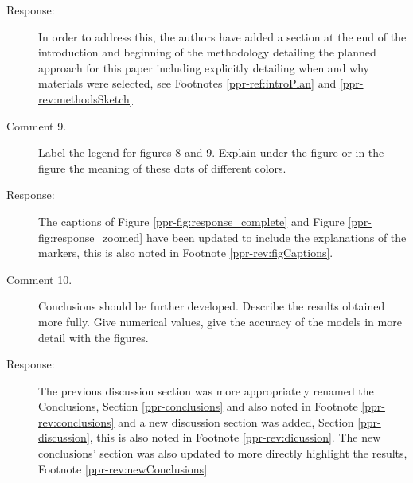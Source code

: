 \documentclass{article}
\begin{document}
\begin{description}
	\item[Response:] In order to address this, the authors have added a section at the end of the introduction and beginning of the methodology detailing the planned approach for this paper including explicitly detailing when and why materials were selected, see Footnotes \ref{ppr-ref:introPlan} and \ref{ppr-rev:methodsSketch}
	\item[Comment 9.] Label the legend for figures 8 and 9. Explain under the figure or in the figure the meaning of these dots of different colors.
	\item[Response:] The captions of Figure \ref{ppr-fig:response_complete} and Figure \ref{ppr-fig:response_zoomed} have been updated to include the explanations of the markers, this is also noted in Footnote \ref{ppr-rev:figCaptions}.
	\item[Comment 10.] Conclusions should be further developed. Describe the results obtained more fully. Give numerical values, give the accuracy of the models in more detail with the figures.
	\item[Response:] The previous discussion section was more appropriately renamed the Conclusions, Section \ref{ppr-conclusions} and also noted in Footnote \ref{ppr-rev:conclusions} and a new discussion section was added, Section \ref{ppr-discussion}, this is also noted in Footnote \ref{ppr-rev:dicussion}.  The new conclusions' section was also updated to more directly highlight the results, Footnote \ref{ppr-rev:newConclusions}
\end{description}
\end{document}
